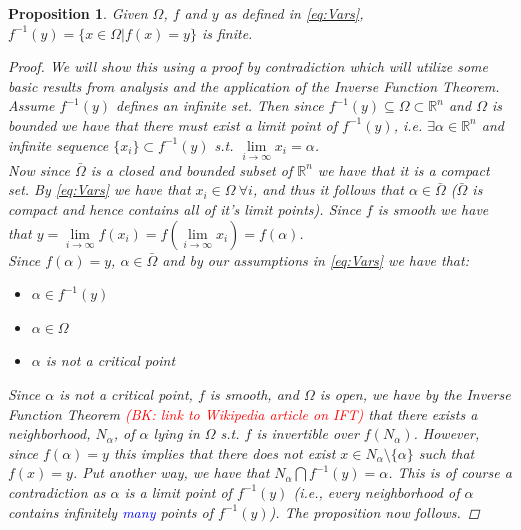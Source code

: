 \documentclass[11pt]{article}
\theoremstyle{plain}
\newtheorem{prop}[thm]{Proposition}
\theoremstyle{definition}
\theoremstyle{remark}
\newcommand{\add}[1]{\textcolor{blue}{#1}}
\newcommand{\delete}[1]{\textcolor{red}{#1}}
\newcommand{\modified}[1]{\textcolor{darkgrn}{#1}}
\begin{document}
\begin{prop} \label{finite}
Given $\Omega$, $f$ and $y$ as defined in \eqref{eq:Vars}, $f^{-1}(y)=\{x\in\Omega|f(x)=y\}$ is finite. 
\begin{proof}
We will show this using a proof by contradiction which will utilize some basic results from analysis and the application of the Inverse Function Theorem. \\

Assume $f^{-1}(y)$ defines an infinite set. Then since $f^{-1}(y)\subseteq\Omega\subset\mathbb{R}^n$ and $\Omega$ is bounded we have that there must exist a limit point of $f^{-1}(y)$, i.e. $\exists \alpha\in\mathbb{R}^n$ and infinite sequence $\{x_i\}\subset f^{-1}(y)$ s.t. $\lim\limits_{i\rightarrow\infty}x_i=\alpha$. \\

Now since $\bar{\Omega}$ is a closed and bounded subset of $\mathbb{R}^n$ we have that it is a compact set. By \eqref{eq:Vars} we have that $x_i\in\Omega \ \forall i$, and thus it follows that $\alpha\in\bar{\Omega}$ ($\bar{\Omega}$ is compact and hence contains all of it's limit points). Since $f$ is smooth we have that $y=\lim\limits_{i\rightarrow\infty}f(x_i)=f\left(\lim\limits_{i\rightarrow\infty}x_i\right)=f(\alpha)$.\\

Since $f(\alpha)=y$, $\alpha\in\bar{\Omega}$ and by our assumptions in \eqref{eq:Vars} we have that:
\begin{itemize}
\item $\alpha\in f^{-1}(y)$
\item $\alpha\in \Omega$
\item $\alpha$ is not a critical point
\end{itemize}

Since $\alpha$ is not a critical point, $f$ is smooth, and $\Omega$ is open, we have by the Inverse Function Theorem \delete{(BK: link to Wikipedia article on IFT)} that there exists a neighborhood, $N_{\alpha}$, of $\alpha$ lying in $\Omega$ s.t. $f$ is invertible over $f(N_{\alpha})$.
However, since $f(\alpha)=y$ this implies that there does not exist $x\in N_{\alpha}\setminus\{\alpha\}$ \modified{such that} $f(x)=y$.
\modified{Put another way, we have that} $N_{\alpha}\bigcap f^{-1}(y)=\alpha$. This is of course a contradiction as $\alpha$ is a limit point of $f^{-1}(y)$ (i.e., every neighborhood of $\alpha$ contains infinitely \add{many} points of $f^{-1}(y)$).
The proposition now follows.
\end{proof}
\end{prop}
\end{document}
